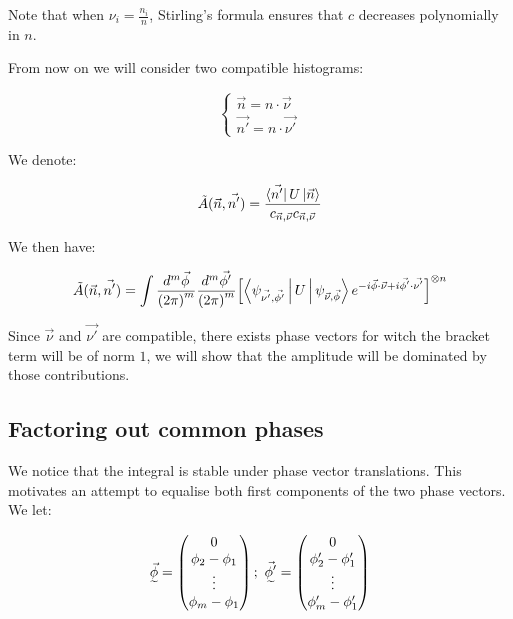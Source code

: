 \documentclass{article}
\begin{document}
Note that when $\nu_{i} = \frac{n_i}{n}$, Stirling's formula ensures that $c$ decreases polynomially in $n$.

From now on we will consider two compatible histograms:

\[\begin{cases}
    \vec{n} = n \cdot \vec{\nu} \\
    \vec{n'} = n \cdot \vec{\nu'}
  \end{cases}\]

We denote:

\[\tilde{A}(\vec{n},\vec{n'}) = \frac{\bra{\vec{n'}} U \ket{\vec{n}}}{c_{\vec{n}, \vec{\nu}} c_{\vec{n}, \vec{\nu}}}\]

We then have:

\[\tilde{A}(\vec{n},\vec{n'}) =  \int \frac{d^{m}\vec{\phi}}{{(2\pi)}^{m}} \frac{d^{m}\vec{\phi'}}{{(2\pi)}^{m}} {\left[ \Braket{\psi_{\vec{\nu'},\vec{\phi'}} | U | \psi_{\vec{\nu},\vec{\phi}}} e^{-i \vec{\phi} \cdot \vec{\nu} + i \vec{\phi'} \cdot \vec{\nu'}} \right] }^{\otimes n} \]

Since $\vec{\nu}$ and $\vec{\nu'}$ are compatible, there exists phase vectors for witch the bracket term will be of norm $1$, we will show that the amplitude will be dominated by those contributions.

\subsection{Factoring out common phases}

We notice that the integral is stable under phase vector translations. This motivates an attempt to equalise both first components of the two phase vectors.  We let:

\[\undertilde{\vec{\phi}} = \begin{pmatrix}
                              0 \\
                              \phi_{2} - \phi_{1} \\
                              \vdots \\
                              \phi_{m} - \phi_{1}
                            \end{pmatrix}
                            ; \ \undertilde{\vec{\phi'}} = \begin{pmatrix}
                              0 \\
                              \phi'_{2} - \phi'_{1} \\
                              \vdots \\
                              \phi'_{m} - \phi'_{1}
                            \end{pmatrix}
                          \]
\end{document}
